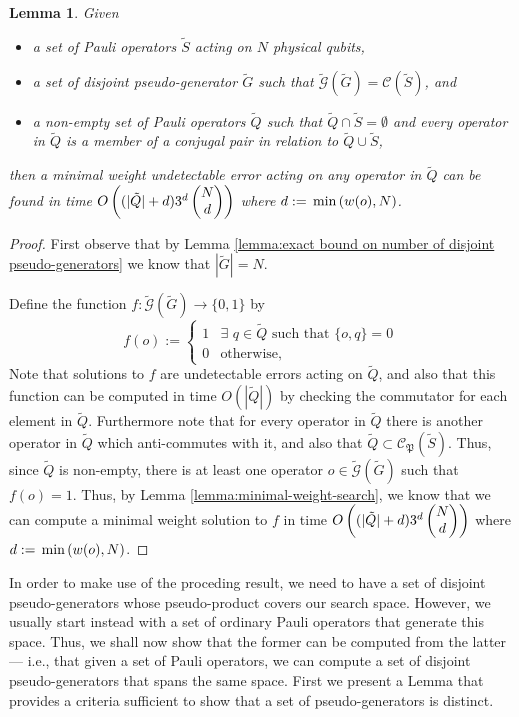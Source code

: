 \documentclass[twocolumn,showpacs,preprintnumbers,amsmath,amssymb,nofootinbib,pra,floatfix]{revtex4-1}
\newtheorem{lemma}{Lemma}
\newenvironment{remark}[1][Remark]{\begin{trivlist}
\item[\hskip \labelsep {\bfseries #1}]}{\end{trivlist}}
\newcommand{\set}{\tilde}
\newcommand{\genfun}{\tilde{\mathcal{G}}}
\newcommand{\pauligroup}{\mathfrak{P}}
\newcommand{\centralizer}{\mathcal{C}}
\begin{document}
\begin{lemma}
\label{lemma:search for minimal weight undetectable error}
Given
\begin{itemize}
\item a set of Pauli operators $\set S$ acting on $N$ physical qubits,
\item a set of disjoint pseudo-generator $\set G$ such that $\genfun(\set G)=\centralizer(\set S)$, and
\item a non-empty set of Pauli operators $\set Q$ such that $\set Q\cap\set S=\emptyset$ and every operator in $\set Q$ is a member of a conjugal pair in relation to $\set Q \cup \set S$,
\end{itemize}
then a minimal weight undetectable error acting on any operator in $\set Q$ can be found in time $O\paren{(|\set Q|+d)3^d\choose{N}{d}}$ where $d:=\,\text{min}\left(w(o),N\right)$.
\end{lemma}

\begin{proof}
First observe that by Lemma \ref{lemma:exact bound on number of disjoint pseudo-generators} we know that $|\set G|=N$.

Define the function $f:\genfun(\set G)\to\{0,1\}$ by
$$f(o):=
\begin{cases}
1 & \exists\,\, q\in\set Q \,\,\text{such that}\,\, \{o,q\}=0\\
0 & \text{otherwise},
\end{cases}
$$
Note that solutions to $f$ are undetectable errors acting on $\set Q$, and also that this function can be computed in time $O(|\set Q|)$ by checking the commutator for each element in $\set Q$.  Furthermore note that for every operator in $\set Q$ there is another operator in $\set Q$ which anti-commutes with it, and also that $\set Q\subset \centralizer_\pauligroup(\set S)$.  Thus, since $\set Q$ is non-empty, there is at least one operator $o\in\genfun(\set G)$ such that $f(o)=1$.  Thus, by Lemma \ref{lemma:minimal-weight-search}, we know that we can compute a minimal weight solution to $f$ in time $O\paren{(|\set Q|+d)3^d\choose{N}{d}}$ where $d:=\,\text{min}\left(w(o),N\right)$.
\end{proof}
\begin{remark}
In order to make use of the proceding result, we need to have a set of disjoint pseudo-generators whose pseudo-product covers our search space.  However, we usually start instead with a set of ordinary Pauli operators that generate this space.  Thus, we shall now show that the former can be computed from the latter --- i.e., that given a set of Pauli operators, we can compute a set of disjoint pseudo-generators that spans the same space.  First we present a Lemma that provides a criteria sufficient to show that a set of pseudo-generators is distinct.
\end{remark}
\end{document}
